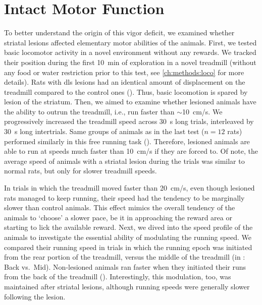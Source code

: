 \section{Intact Motor Function}
\label{ch:lesion:motorOk}

To better understand the origin of this vigor deficit, we examined whether striatal lesions affected elementary motor abilities of the animals.
First, we tested basic locomotor activity in a novel environment without any rewards.
We tracked their position during the first 10~min of exploration in a novel treadmill (without any food or water restriction prior to this test, see \autoref{ch:methods:loco} for more details).
Rats with \gls{dls} lesions had an identical amount of displacement on the treadmill compared to the control ones ().
Thus, basic locomotion is spared by lesion of the striatum.
Then, we aimed to examine whether lesioned animals have the ability to outrun the treadmill, i.e., run faster than $\sim$10~cm/s.
We progressively increased the treadmill speed across 30~s long trials, interleaved by 30~s long intertrials.
Same groups of animals as in the last test ($n=12$ rats) performed similarly in this free running task ().
Therefore, lesioned animals are able to run at speeds much faster than 10~cm/s if they are forced to.
Of note, the average speed of animals with a striatal lesion during the trials was similar to normal rats, but only for slower treadmill speeds.

In trials in which the treadmill moved faster than 20~cm/s, even though lesioned rats managed to keep running, their speed had the tendency to be marginally slower than control animals.
This effect mimics the overall tendency of the animals to `choose' a slower pace, be it in approaching the reward area or starting to lick the available reward.
Next, we dived into the speed profile of the animals to investigate the essential ability of modulating the running speed.
We compared their running speed in trials in which the running epoch was initiated from the rear portion of the treadmill, versus the middle of the treadmill (in : Back vs.\ Mid).
Non-lesioned animals ran faster when they initiated their runs from the back of the treadmill ().
Interestingly, this modulation, too, was maintained after striatal lesions, although running speeds were generally slower following the lesion.


